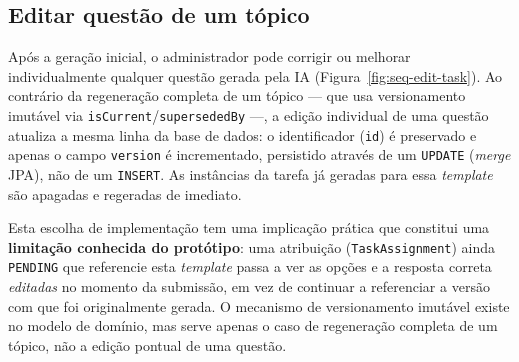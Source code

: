 \subsection{Editar quest\~ao de um t\'opico}
\label{ssec:seq-edit-task}

Ap\'os a gera\c{c}\~ao inicial, o administrador pode corrigir ou melhorar
individualmente qualquer quest\~ao gerada pela IA
(Figura~\ref{fig:seq-edit-task}). Ao contr\'ario da regenera\c{c}\~ao
completa de um t\'opico --- que usa versionamento imut\'avel via
\texttt{isCurrent}/\texttt{supersededBy} ---, a edi\c{c}\~ao individual de
uma quest\~ao atualiza a mesma linha da base de dados: o identificador
(\texttt{id}) \'e preservado e apenas o campo \texttt{version} \'e
incrementado, persistido atrav\'es de um \texttt{UPDATE} (\emph{merge}
JPA), n\~ao de um \texttt{INSERT}. As inst\^ancias da tarefa j\'a geradas
para essa \emph{template} s\~ao apagadas e regeradas de imediato.

Esta escolha de implementa\c{c}\~ao tem uma implica\c{c}\~ao pr\'atica que
constitui uma \textbf{limita\c{c}\~ao conhecida do prot\'otipo}: uma
atribui\c{c}\~ao (\texttt{TaskAssignment}) ainda \texttt{PENDING} que
referencie esta \emph{template} passa a ver as op\c{c}\~oes e a resposta
correta \emph{editadas} no momento da submiss\~ao, em vez de continuar a
referenciar a vers\~ao com que foi originalmente gerada. O mecanismo de
versionamento imut\'avel existe no modelo de dom\'inio, mas serve apenas o
caso de regenera\c{c}\~ao completa de um t\'opico, n\~ao a edi\c{c}\~ao
pontual de uma quest\~ao.

